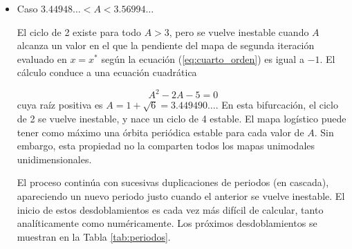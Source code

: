 \begin{itemize}
                \item Caso $3.44948\ldots < A < 3.56994\ldots$

                    El ciclo de 2 existe para todo $A > 3$, pero se vuelve inestable cuando $A$ alcanza un valor en el que la pendiente del mapa de segunda iteración evaluado en $x = x^{*}$ según la ecuación (\ref{eq:cuarto_orden}) es igual a $-1$. El cálculo conduce a una ecuación cuadrática

                    \begin{equation}
                        A^{2} - 2A - 5 = 0      
                    \end{equation}
                    cuya raíz positiva es $A = 1 + \sqrt{6} = 3.449490\ldots$. En esta bifurcación, el ciclo de 2 se vuelve inestable, y nace un ciclo de 4 estable. El mapa logístico puede tener como máximo una órbita periódica estable para cada valor de $A$. Sin embargo, esta propiedad no la comparten todos los mapas unimodales unidimensionales. 

                    El proceso continúa con sucesivas duplicaciones de periodos (en cascada), apareciendo un nuevo periodo justo cuando el anterior se vuelve inestable. El inicio de estos desdoblamientos es cada vez más difícil de calcular, tanto analíticamente como numéricamente. Los próximos desdoblamientos se muestran en la Tabla \ref{tab:periodos}.


\end{itemize}

